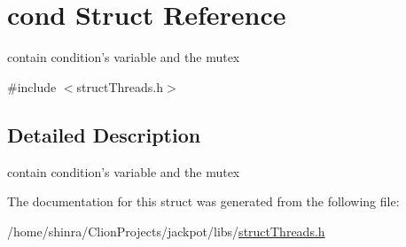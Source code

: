 \hypertarget{structcond}{\section{cond Struct Reference}
\label{structcond}
}


contain condition's variable and the mutex  




{\ttfamily \#include $<$struct\+Threads.\+h$>$}



\subsection{Detailed Description}
contain condition's variable and the mutex 

The documentation for this struct was generated from the following file\+:\begin{DoxyCompactItemize}
\item 
/home/shinra/\+Clion\+Projects/jackpot/libs/\hyperlink{struct_threads_8h}{struct\+Threads.\+h}\end{DoxyCompactItemize}
